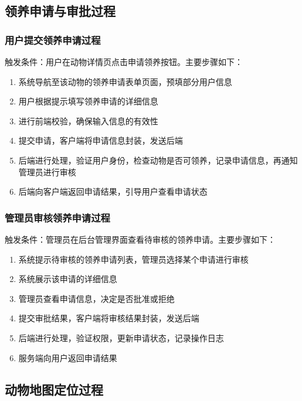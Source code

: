 \documentclass[12pt,a4paper,UTF8]{article}
\begin{document}
\subsection{领养申请与审批过程}

\subsubsection{用户提交领养申请过程}

触发条件：用户在动物详情页点击申请领养按钮。主要步骤如下：

\begin{enumerate}[topsep=2pt, partopsep=0pt]
  \item 系统导航至该动物的领养申请表单页面，预填部分用户信息
  \item 用户根据提示填写领养申请的详细信息
  \item 进行前端校验，确保输入信息的有效性
  \item 提交申请，客户端将申请信息封装，发送后端
  \item 后端进行处理，验证用户身份，检查动物是否可领养，记录申请信息，再通知管理员进行审核
  \item 后端向客户端返回申请结果，引导用户查看申请状态
\end{enumerate}

\subsubsection{管理员审核领养申请过程}

触发条件：管理员在后台管理界面查看待审核的领养申请。主要步骤如下：

\begin{enumerate}[topsep=2pt, partopsep=0pt]
  \item 系统提示待审核的领养申请列表，管理员选择某个申请进行审核
  \item 系统展示该申请的详细信息
  \item 管理员查看申请信息，决定是否批准或拒绝
  \item 提交审批结果，客户端将审核结果封装，发送后端
  \item 后端进行处理，验证权限，更新申请状态，记录操作日志
  \item 服务端向用户返回申请结果
\end{enumerate}

\subsection{动物地图定位过程}
\end{document}

